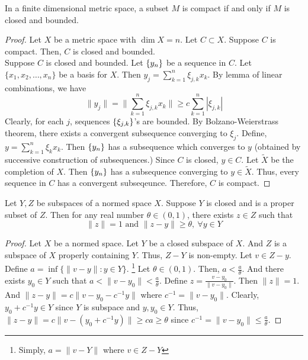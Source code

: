 \begin{theorem}
	In a finite dimensional metric space, a subset $M$ is compact if and only if $M$ is closed and bounded.
\end{theorem}
\begin{proof}
	Let $X$ be a metric space with $\dim X = n$.
	Let $C \subset X$.
	Suppose $C$ is compact.
	Then, $C$ is closed and bounded.\\

	Suppose $C$ is closed and bounded.
	Let $\left\{y_n\right\}$ be a sequence in $C$.
	Let $\{x_1,x_2,\dots,x_n\}$ be a basis for $X$.
	Then $y_j = \sum_{k=1}^n \xi_{j,k} x_k$.
	By lemma of linear combinations, we have
	\[ \|y_j\| = \| \sum_{k=1}^n \xi_{j,k} x_k \| \ge c \sum_{k=1}^n |\xi_{j,k}| \]
	Clearly, for each $j$, sequences $\left\{\xi_{j,k}\right\}$'s are bounded.
	By Bolzano-Weierstrass theorem, there exists a convergent subsequence converging to $\xi_j$.
	Define, $y = \sum_{k=1}^n \xi_k x_k$.
	Then $\left\{y_n\right\}$ has a subsequence which converges to $y$ (obtained by successive construction of subsequences.)
	Since $C$ is closed, $y \in C$.
	Let $\tilde{X}$ be the completion of $X$.
	Then $\left\{y_n\right\}$ has a subsequence converging to $y \in \tilde{X}$.
	Thus, every sequence in $C$ has a convergent subseqeunce.
	Therefore, $C$ is compact.
\end{proof}

\begin{lemma}[Riesz]
	Let $Y,Z$ be subspaces of a normed space $X$.
	Suppose $Y$ is closed and is a proper subset of $Z$.
	Then for any real number $\theta \in (0,1)$, there exists $z \in Z$ such that
	\[ \| z \| = 1 \text{ and } \| z-y \| \ge \theta,\ \forall y \in Y \]
\end{lemma}
\begin{proof}
	Let $X$ be a normed space.
	Let $Y$ be a closed subspace of $X$.
	And $Z$ is a subspace of $X$ properly containing $Y$.
	Thus, $Z-Y$ is non-empty.
	Let $v \in Z-y$.
	Define $a = \inf \{ \|v-y\| : y \in Y\}$.
	\dag\footnote{Simply, $a = \|v-Y\|$ where $v \in Z-Y$}
	Let $\theta \in (0,1)$.
	Then, $a < \frac{a}{\theta}$.
	And there exists $y_0 \in Y$ such that $a < \|v-y_0\| < \frac{a}{\theta}$.
	Define $z = \frac{v-y_0}{\|v-y_0\|}$.
	Then $\|z\|=1$.
	And $\|z-y\| = c\|v-y_0-c^{-1}y\|$ where $c^{-1} = \|v-y_0\|$.
	Clearly, $y_0+c^{-1}y \in Y$ since $Y$ is subspace and $y,y_0 \in Y$.
	Thus, $\|z-y\| = c\|v-(y_0+c^{-1}y)\| \ge ca \ge \theta$ since $c^{-1} = \|v-y_0\| \le \frac{a}{\theta}$.
\end{proof}

